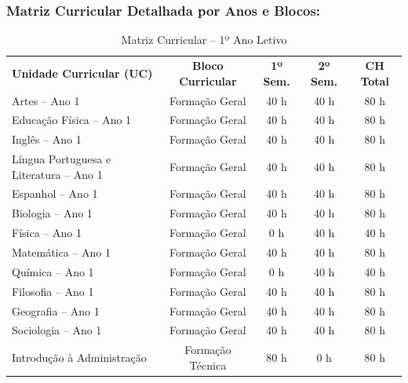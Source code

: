 
\subsubsection{Matriz Curricular Detalhada por Anos e Blocos:}

\begin{table}[H]
\centering
\small
\caption{Matriz Curricular -- 1º Ano Letivo}
\label{qua:matriz-ano1}
\vspace{0.2cm}
\begin{tabularx}{\linewidth}{|X|c|c|c|c|}
\hline
\rowcolor{ifscgreen!20}
\multicolumn{5}{|c|}{\textbf{\large 1º ANO LETIVO (SEMESTRES 1 E 2)}} \\ \hline
\rowcolor{cinzaTabela}
\textbf{Unidade Curricular (UC)} & \textbf{Bloco Curricular} & \textbf{1º Sem.} & \textbf{2º Sem.} & \textbf{CH Total} \\ \hline
Artes -- Ano 1 & Formação Geral & 40 h & 40 h & 80 h \\ \hline
Educação Física -- Ano 1 & Formação Geral & 40 h & 40 h & 80 h \\ \hline
Inglês -- Ano 1 & Formação Geral & 40 h & 40 h & 80 h \\ \hline
Língua Portuguesa e Literatura -- Ano 1 & Formação Geral & 40 h & 40 h & 80 h \\ \hline
Espanhol -- Ano 1 & Formação Geral & 40 h & 40 h & 80 h \\ \hline
Biologia -- Ano 1 & Formação Geral & 40 h & 40 h & 80 h \\ \hline
Física -- Ano 1 & Formação Geral & 0 h & 40 h & 40 h \\ \hline
Matemática -- Ano 1 & Formação Geral & 40 h & 40 h & 80 h \\ \hline
Química -- Ano 1 & Formação Geral & 0 h & 40 h & 40 h \\ \hline
Filosofia -- Ano 1 & Formação Geral & 40 h & 40 h & 80 h \\ \hline
Geografia -- Ano 1 & Formação Geral & 40 h & 40 h & 80 h \\ \hline
Sociologia -- Ano 1 & Formação Geral & 40 h & 40 h & 80 h \\ \hline
Introdução à Administração & Formação Técnica & 80 h & 0 h & 80 h \\ \hline

\end{tabularx}
\end{table}
